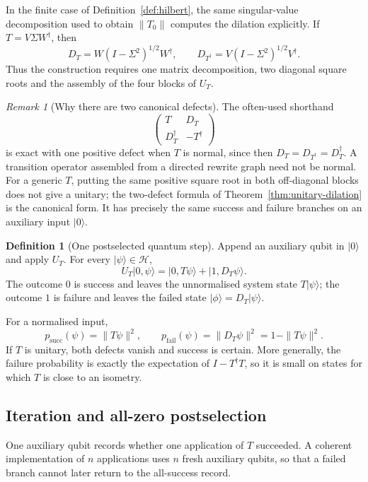 \documentclass[11pt,a4paper]{article}
\theoremstyle{plain}
\theoremstyle{definition}
\newtheorem{definition}[theorem]{Definition}
\theoremstyle{remark}
\newtheorem{remark}[theorem]{Remark}
\begin{document}
In the finite case of Definition~\ref{def:hilbert}, the same singular-value decomposition used to
obtain $\|T_0\|$ computes the dilation explicitly. If $T=V\Sigma W^\dagger$, then
\[
D_T=W(I-\Sigma^2)^{1/2}W^\dagger,
\qquad
D_{T^\dagger}=V(I-\Sigma^2)^{1/2}V^\dagger.
\]
Thus the construction requires one matrix decomposition, two diagonal square roots and the assembly
of the four blocks of $U_T$.

\begin{remark}[Why there are two canonical defects]
The often-used shorthand
\[
\begin{pmatrix}
T & D_T \\
D_T^\dagger & -T^\dagger
\end{pmatrix}
\]
is exact with one positive defect when $T$ is normal, since then
$D_T=D_{T^\dagger}=D_T^\dagger$. A transition operator assembled from a directed rewrite graph need
not be normal. For a generic $T$, putting the same positive square root in both off-diagonal blocks
does not give a unitary; the two-defect formula of Theorem~\ref{thm:unitary-dilation} is the canonical
form. It has precisely the same success and failure branches on an auxiliary input $|0\rangle$.
\end{remark}

\begin{definition}[One postselected quantum step]
\label{def:quantum-step}
Append an auxiliary qubit in $|0\rangle$ and apply $U_T$. For every
$|\psi\rangle\in\mathcal{H}$,
\[
U_T|0,\psi\rangle
 =
|0,T\psi\rangle+|1,D_T\psi\rangle.
\]
The outcome $0$ is success and leaves the unnormalised system state $T|\psi\rangle$; the outcome $1$
is failure and leaves the failed state $|\phi\rangle=D_T|\psi\rangle$.
\end{definition}

For a normalised input,
\[
p_{\mathrm{succ}}(\psi)=\|T\psi\|^2,
\qquad
p_{\mathrm{fail}}(\psi)=\|D_T\psi\|^2
 =1-\|T\psi\|^2.
\]
If $T$ is unitary, both defects vanish and success is certain. More generally, the failure probability
is exactly the expectation of $I-T^\dagger T$, so it is small on states for which $T$ is close to an
isometry.

\subsection{Iteration and all-zero postselection}
\label{sec:iteration}

One auxiliary qubit records whether one application of $T$ succeeded. A coherent implementation of
$n$ applications uses $n$ fresh auxiliary qubits, so that a failed branch cannot later return to the
all-success record.
\end{document}
